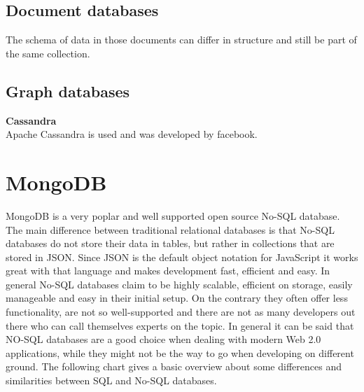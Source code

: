 \documentclass[11pt]{article}
\begin{document}
\subsection{Document databases}
The schema of data in those documents can differ in structure and still be part of the same collection.
\subsection{Graph databases}
 
\textbf{Cassandra} \\
Apache Cassandra is used and was developed by facebook. \\


\section{MongoDB} 
MongoDB is a very poplar and well supported open source No-SQL database. The main difference between traditional relational databases is that No-SQL databases do not store their data in tables, but rather in collections that are stored in JSON. Since JSON is the default object notation for JavaScript it works great with that language and makes development fast, efficient and easy. In general No-SQL databases claim to be highly scalable, efficient on storage, easily manageable and easy in their initial setup. On the contrary they often offer less functionality, are not so well-supported and there are not as many developers out there who can call themselves experts on the topic. 
	In general it can be said that NO-SQL databases are a good choice when dealing with modern Web 2.0 applications, while they might not be the way to go when developing on different ground. \cite{nosqladvantages} The following chart gives a basic overview about some differences and similarities between SQL and No-SQL databases. 
	
\end{document}
